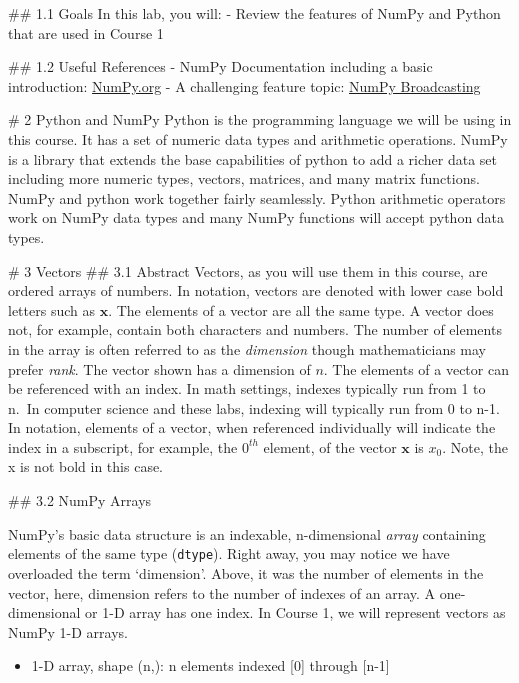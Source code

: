 \documentclass[11pt]{article}
\providecommand{\tightlist}{%
      \setlength{\itemsep}{0pt}\setlength{\parskip}{0pt}}
\begin{document}
    \#\# 1.1 Goals In this lab, you will: - Review the features of NumPy and
Python that are used in Course 1

    \#\# 1.2 Useful References - NumPy Documentation including a basic
introduction: \href{https://NumPy.org/doc/stable/}{NumPy.org} - A
challenging feature topic:
\href{https://NumPy.org/doc/stable/user/basics.broadcasting.html}{NumPy
Broadcasting}

    \# 2 Python and NumPy Python is the programming language we will be
using in this course. It has a set of numeric data types and arithmetic
operations. NumPy is a library that extends the base capabilities of
python to add a richer data set including more numeric types, vectors,
matrices, and many matrix functions. NumPy and python work together
fairly seamlessly. Python arithmetic operators work on NumPy data types
and many NumPy functions will accept python data types.

    \# 3 Vectors \#\# 3.1 Abstract Vectors, as you will use them in this
course, are ordered arrays of numbers. In notation, vectors are denoted
with lower case bold letters such as \(\mathbf{x}\). The elements of a
vector are all the same type. A vector does not, for example, contain
both characters and numbers. The number of elements in the array is
often referred to as the \emph{dimension} though mathematicians may
prefer \emph{rank}. The vector shown has a dimension of \(n\). The
elements of a vector can be referenced with an index. In math settings,
indexes typically run from 1 to n.~In computer science and these labs,
indexing will typically run from 0 to n-1. In notation, elements of a
vector, when referenced individually will indicate the index in a
subscript, for example, the \(0^{th}\) element, of the vector
\(\mathbf{x}\) is \(x_0\). Note, the x is not bold in this case.

    \#\# 3.2 NumPy Arrays

NumPy's basic data structure is an indexable, n-dimensional \emph{array}
containing elements of the same type (\texttt{dtype}). Right away, you
may notice we have overloaded the term `dimension'. Above, it was the
number of elements in the vector, here, dimension refers to the number
of indexes of an array. A one-dimensional or 1-D array has one index. In
Course 1, we will represent vectors as NumPy 1-D arrays.

\begin{itemize}
\tightlist
\item
  1-D array, shape (n,): n elements indexed {[}0{]} through {[}n-1{]}
\end{itemize}
\end{document}
